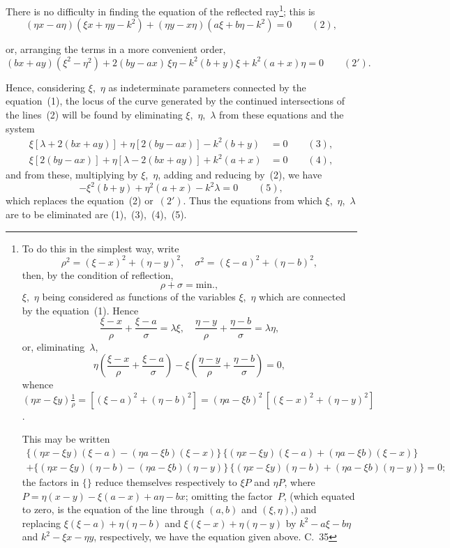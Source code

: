 \documentclass[11pt,a4paper]{article}
\begin{document}
There is no difficulty in finding the equation of the reflected ray\footnote{To do this in the simplest way, write
\[
\rho^2 = (\xi-x)^2 + (\eta-y)^2, \quad \sigma^2 = (\xi-a)^2 + (\eta-b)^2,
\]
then, by the condition of reflection,
\[
\rho + \sigma = \text{min.},
\]
$\xi$,~$\eta$ being considered as functions of the variables $\xi$,~$\eta$ which are connected by the equation~(1). Hence
\[
\frac{\xi-x}{\rho} + \frac{\xi-a}{\sigma} = \lambda\xi, \quad \frac{\eta-y}{\rho} + \frac{\eta-b}{\sigma} = \lambda\eta,
\]
or, eliminating~$\lambda$,
\[
\eta\left(\frac{\xi-x}{\rho} + \frac{\xi-a}{\sigma}\right) - \xi\left(\frac{\eta-y}{\rho} + \frac{\eta-b}{\sigma}\right) = 0,
\]
whence $(\eta x - \xi y)\frac{1}{\rho} = [(\xi-a)^2 + (\eta-b)^2] = (\eta a - \xi b)^2 \, [(\xi-x)^2 + (\eta-y)^2]$.

This may be written
\begin{multline*}
\{(\eta x - \xi y)(\xi-a) - (\eta a - \xi b)(\xi-x)\} \, \{ (\eta x - \xi y)(\xi-a) + (\eta a - \xi b)(\xi-x) \} \\
+ \{ (\eta x - \xi y)(\eta-b) - (\eta a - \xi b)(\eta-y) \} \, \{ (\eta x - \xi y)(\eta-b) + (\eta a - \xi b)(\eta-y) \} = 0;
\end{multline*}
the factors in $\{\}$ reduce themselves respectively to $\xi P$ and $\eta P$, where $P = \eta(x-y) - \xi(a-x) + a\eta - bx$; omitting the factor~$P$, (which equated to zero, is the equation of the line through $(a,b)$ and $(\xi,\eta)$,) and replacing $\xi(\xi-a) + \eta(\eta-b)$ and $\xi(\xi-x) + \eta(\eta-y)$ by $k^2 - a\xi - b\eta$ and $k^2 - \xi x - \eta y$, respectively, we have the equation given above. C.~35}; this is
\[
(\eta x - a\eta)(\xi x + \eta y - k^2) + (\eta y - x\eta)(a\xi + b\eta - k^2) = 0 \qquad(2),
\]

\newpage
or, arranging the terms in a more convenient order,
\[
(bx + ay)(\xi^2 - \eta^2) + 2(by - ax)\,\xi\eta - k^2(b+y)\xi + k^2(a+x)\eta = 0 \qquad(2').
\]

Hence, considering $\xi$,~$\eta$ as indeterminate parameters connected by the equation~(1), the locus of the curve generated by the continued intersections of the lines~(2) will be found by eliminating $\xi$,~$\eta$,~$\lambda$ from these equations and the system
\begin{align*}
\xi[\lambda + 2(bx+ay)] + \eta[2(by-ax)] - k^2(b+y) &= 0 \qquad(3),\\
\xi[2(by-ax)] + \eta[\lambda - 2(bx+ay)] + k^2(a+x) &= 0 \qquad(4),
\end{align*}
and from these, multiplying by $\xi$,~$\eta$, adding and reducing by~(2), we have
\[
-\xi^2(b+y) + \eta^2(a+x) - k^2\lambda = 0 \qquad(5),
\]
which replaces the equation~(2) or~$(2')$. Thus the equations from which $\xi$,~$\eta$,~$\lambda$ are to be eliminated are (1),~(3),~(4),~(5).
\end{document}
